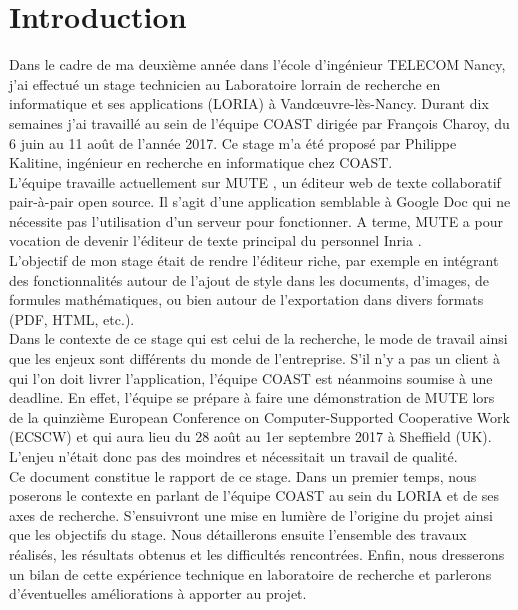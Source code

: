 \documentclass[12pt]{article}
\begin{document}
\section*{Introduction}
Dans le cadre de ma deuxième année dans l'école d'ingénieur TELECOM Nancy, j'ai effectué un stage technicien au Laboratoire lorrain de recherche en informatique et ses applications (LORIA) \cite{loria} à Vand\oe{}uvre-lès-Nancy. Durant dix semaines j'ai travaillé au sein de l'équipe COAST \cite{coast} dirigée par François Charoy, du 6 juin au 11 août de l'année 2017. Ce stage m'a été proposé par Philippe Kalitine, ingénieur en recherche en informatique chez COAST.\\

L'équipe travaille actuellement sur MUTE \cite{mute}, un éditeur web de texte collaboratif pair-à-pair open source. Il s'agit d'une application semblable à Google Doc qui ne nécessite pas l'utilisation d'un serveur pour fonctionner. A terme, MUTE a pour vocation de devenir l'éditeur de texte principal du personnel Inria \cite{inria}.\\

L'objectif de mon stage était de rendre l'éditeur riche, par exemple en intégrant des fonctionnalités autour de l'ajout de style dans les documents, d'images, de formules mathématiques, ou bien autour de l'exportation dans divers formats (PDF, HTML, etc.).\\

Dans le contexte de ce stage qui est celui de la recherche, le mode de travail ainsi que les enjeux sont différents du monde de l'entreprise. S'il n'y a pas un client à qui l'on doit livrer l'application, l'équipe COAST est néanmoins soumise à une deadline. En effet, l'équipe se prépare à faire une démonstration de MUTE lors de la quinzième European Conference on Computer-Supported Cooperative Work (ECSCW) \cite{ecscw} et qui aura lieu du 28 août au 1er septembre 2017 à Sheffield (UK). L'enjeu n'était donc pas des moindres et nécessitait un travail de qualité.\\

Ce document constitue le rapport de ce stage. Dans un premier temps, nous poserons le contexte en parlant de l'équipe COAST au sein du LORIA et de ses axes de recherche. S'ensuivront une mise en lumière de l'origine du projet ainsi que les objectifs du stage. Nous détaillerons ensuite l'ensemble des travaux réalisés, les résultats obtenus et les difficultés rencontrées. Enfin, nous dresserons un bilan de cette expérience technique en laboratoire de recherche et parlerons d'éventuelles améliorations à apporter au projet.\\
\end{document}
